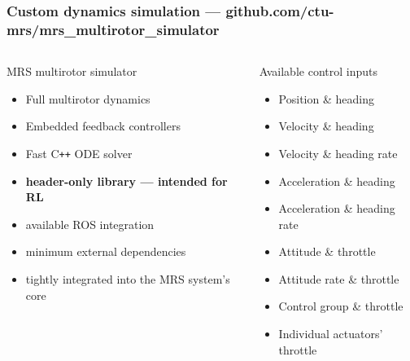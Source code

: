 \documentclass[aspectratio=169]{beamer}
\begin{document}
\begin{frame}
  \frametitle{Custom dynamics simulation --- github.com/ctu-mrs/mrs\_multirotor\_simulator}

  \vspace{-1em}

  \begin{columns}[c]


    \begin{block}{MRS multirotor simulator}
      \begin{itemize}
        \item Full multirotor dynamics
        \item Embedded feedback controllers
        \item Fast C\texttt{++} ODE solver
        \item \textbf{header-only library --- {\color{red} intended for RL}}
        \item available ROS integration
        \item minimum external dependencies
        \item tightly integrated into the MRS system's core
      \end{itemize}
    \end{block}


    \begin{block}{Available control inputs}
      \small
      \begin{itemize}
        \item Position \& heading
        \item Velocity \& heading
        \item Velocity \& heading rate
        \item Acceleration \& heading
        \item Acceleration \& heading rate
        \item Attitude \& throttle
        \item Attitude rate \& throttle
        \item Control group \& throttle
        \item Individual actuators' throttle
      \end{itemize}
    \end{block}
  \end{columns}


\end{frame}
\end{document}
